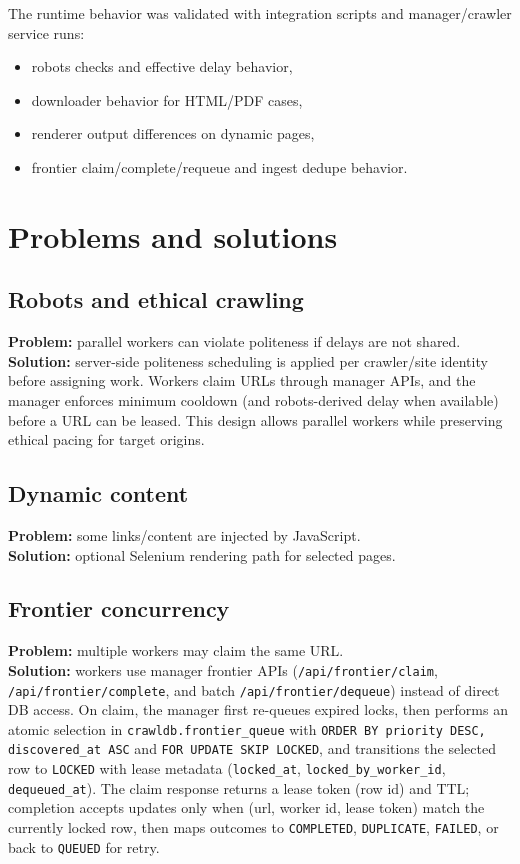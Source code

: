 \documentclass[9pt]{IEEEtran}
\begin{document}
The runtime behavior was validated with integration scripts and manager/crawler service runs:
\begin{itemize}
    \item robots checks and effective delay behavior,
    \item downloader behavior for HTML/PDF cases,
    \item renderer output differences on dynamic pages,
    \item frontier claim/complete/requeue and ingest dedupe behavior.
\end{itemize}

\section{Problems and solutions}
\subsection{Robots and ethical crawling}
\textbf{Problem:} parallel workers can violate politeness if delays are not shared.\\
\textbf{Solution:} server-side politeness scheduling is applied per crawler/site identity before assigning work. Workers claim URLs through manager APIs, and the manager enforces minimum cooldown (and robots-derived delay when available) before a URL can be leased.
This design allows parallel workers while preserving ethical pacing for target origins.

\subsection{Dynamic content}
\textbf{Problem:} some links/content are injected by JavaScript.\\
\textbf{Solution:} optional Selenium rendering path for selected pages.

\subsection{Frontier concurrency}
\textbf{Problem:} multiple workers may claim the same URL.\\
\textbf{Solution:} workers use manager frontier APIs (\texttt{/api/frontier/claim}, \texttt{/api/frontier/complete}, and batch \texttt{/api/frontier/dequeue}) instead of direct DB access.
On claim, the manager first re-queues expired locks, then performs an atomic selection in \texttt{crawldb.frontier\_queue} with
\texttt{ORDER BY priority DESC, discovered\_at ASC} and \texttt{FOR UPDATE SKIP LOCKED}, and transitions the selected row to \texttt{LOCKED}
with lease metadata (\texttt{locked\_at}, \texttt{locked\_by\_worker\_id}, \texttt{dequeued\_at}).
The claim response returns a lease token (row id) and TTL; completion accepts updates only when
(url, worker id, lease token) match the currently locked row, then maps outcomes to \texttt{COMPLETED}, \texttt{DUPLICATE}, \texttt{FAILED}, or back to \texttt{QUEUED} for retry.
\end{document}
